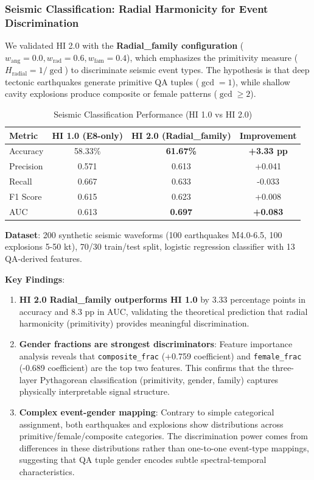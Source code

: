 \documentclass[11pt]{article}
\theoremstyle{remark}
\begin{document}
\subsubsection{Seismic Classification: Radial Harmonicity for Event Discrimination}

We validated HI 2.0 with the \textbf{Radial\_family configuration} ($w_{\text{ang}}=0.0, w_{\text{rad}}=0.6, w_{\text{fam}}=0.4$), which emphasizes the primitivity measure ($H_{\text{radial}} = 1/\gcd$) to discriminate seismic event types. The hypothesis is that deep tectonic earthquakes generate primitive QA tuples ($\gcd=1$), while shallow cavity explosions produce composite or female patterns ($\gcd\geq2$).

\begin{table}[h]
\centering
\caption{Seismic Classification Performance (HI 1.0 vs HI 2.0)}
\label{tab:seismic_hi2}
\begin{tabular}{lccc}
\toprule
\textbf{Metric} & \textbf{HI 1.0 (E8-only)} & \textbf{HI 2.0 (Radial\_family)} & \textbf{Improvement} \\
\midrule
Accuracy & 58.33\% & \textbf{61.67\%} & \textbf{+3.33 pp} \\
Precision & 0.571 & 0.613 & +0.041 \\
Recall & 0.667 & 0.633 & -0.033 \\
F1 Score & 0.615 & 0.623 & +0.008 \\
AUC & 0.613 & \textbf{0.697} & \textbf{+0.083} \\
\bottomrule
\end{tabular}
\end{table}

\textbf{Dataset}: 200 synthetic seismic waveforms (100 earthquakes M4.0-6.5, 100 explosions 5-50 kt), 70/30 train/test split, logistic regression classifier with 13 QA-derived features.

\textbf{Key Findings}:

\begin{enumerate}
\item \textbf{HI 2.0 Radial\_family outperforms HI 1.0} by 3.33 percentage points in accuracy and 8.3 pp in AUC, validating the theoretical prediction that radial harmonicity (primitivity) provides meaningful discrimination.

\item \textbf{Gender fractions are strongest discriminators}: Feature importance analysis reveals that \texttt{composite\_frac} (+0.759 coefficient) and \texttt{female\_frac} (-0.689 coefficient) are the top two features. This confirms that the three-layer Pythagorean classification (primitivity, gender, family) captures physically interpretable signal structure.

\item \textbf{Complex event-gender mapping}: Contrary to simple categorical assignment, both earthquakes and explosions show distributions across primitive/female/composite categories. The discrimination power comes from differences in these distributions rather than one-to-one event-type mappings, suggesting that QA tuple gender encodes subtle spectral-temporal characteristics.
\end{enumerate}
\end{document}
